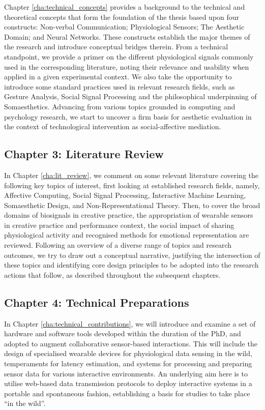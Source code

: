 Chapter \ref{cha:technical_concepts} provides a background to the technical and theoretical concepts that form the foundation of the thesis based upon four constructs: Non-verbal Communication; Physiological Sensors; The Aesthetic Domain; and Neural Networks. These constructs establish the major themes of the research and introduce conceptual bridges therein. From a technical standpoint, we provide a primer on the different physiological signals commonly used in the corresponding literature, noting their relevance and usability when applied in a given experimental context. We also take the opportunity to introduce some standard practices used in relevant research fields, such as Gesture Analysis, Social Signal Processing and the philosophical underpinning of Somaesthetics. Advancing from various topics grounded in computing and psychology research, we start to uncover a firm basis for aesthetic evaluation in the context of technological intervention as social-affective mediation.

\subsection*{Chapter 3: Literature Review}

In Chapter \ref{cha:lit_review}, we comment on some relevant literature covering the following key topics of interest, first looking at established research fields, namely, Affective Computing, Social Signal Processing, Interactive Machine Learning, Somaesthetic Design, and Non-Representational Theory. Then, to cover the broad domains of biosignals in creative practice, the appropriation of wearable sensors in creative practice and performance context, the social impact of sharing physiological activity and recognised methods for emotional representation are reviewed. Following an overview of a diverse range of topics and research outcomes, we try to draw out a conceptual narrative, justifying the intersection of these topics and identifying core design principles to be adopted into the research actions that follow, as described throughout the subsequent chapters.

\subsection*{Chapter 4: Technical Preparations}

In Chapter \ref{cha:technical_contributions}, we will introduce and examine a set of hardware and software tools developed within the duration of the PhD, and adopted to augment collaborative sensor-based interactions. This will include the design of specialised wearable devices for physiological data sensing in the wild, temperaments for latency estimation, and systems for processing and preparing sensor data for various interactive environments. An underlying aim here is to utilise web-based data transmission protocols to deploy interactive systems in a portable and spontaneous fashion, establishing a basis for studies to take place ``in the wild''.

